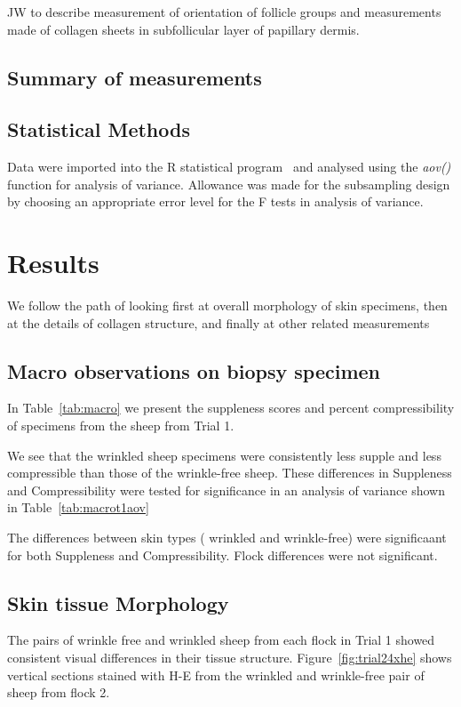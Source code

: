 \documentclass[titlepage]{article}  %
\begin{document}
JW to describe measurement of orientation of follicle groups
and measurements made of collagen sheets in subfollicular layer of
papillary dermis.


\subsection{Summary of measurements}


\subsection{Statistical Methods}

Data were imported into the R statistical program~\cite{rprog:13} and analysed using the {\em aov()} function for analysis of variance.
Allowance was made for the subsampling design by choosing  an appropriate error level for the F tests in analysis of variance. 

\section{Results}
We follow the path of looking first at overall morphology of skin specimens, then at the details of collagen structure, and finally at other related measurements

\subsection{Macro observations on biopsy specimen}
In Table~\ref{tab:macro} we present the suppleness scores and percent compressibility of specimens from the sheep from Trial 1.

We see that the wrinkled sheep specimens were consistently less supple and less compressible than those of the wrinkle-free sheep.
These differences in Suppleness and Compressibility were tested for significance in an analysis of variance shown in Table~\ref{tab:macrot1aov}

The differences between skin types ( wrinkled and wrinkle-free) were significaant for both Suppleness and Compressibility. Flock differences were not significant.

\subsection{Skin tissue Morphology}
The pairs of wrinkle free and wrinkled sheep from each flock in Trial 1 showed consistent visual differences in their tissue structure. Figure~\ref{fig:trial24xhe} shows vertical sections stained with H-E from the wrinkled and wrinkle-free pair of sheep from flock 2.
\end{document}
